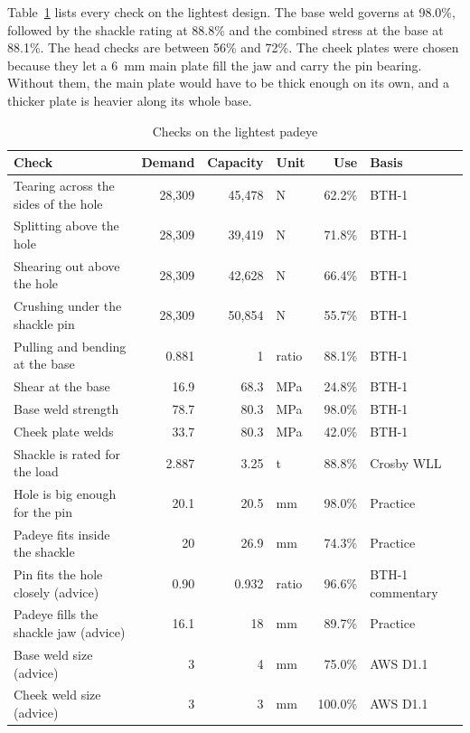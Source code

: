 Table~\ref{tab:padeye-checks} lists every check on the lightest design. The
base weld governs at 98.0\%, followed by the shackle rating at 88.8\% and the
combined stress at the base at 88.1\%. The head checks are between 56\% and
72\%. The cheek plates were chosen because they let a 6~mm main plate fill the
jaw and carry the pin bearing. Without them, the main plate would have to be
thick enough on its own, and a thicker plate is heavier along its whole base.

\begin{table}[H]
\centering
\caption{Checks on the lightest padeye}
\label{tab:padeye-checks}
\small
\begin{tabularx}{\textwidth}{>{\raggedright\arraybackslash}Xrrlr>{\raggedright\arraybackslash}p{}}
\toprule
\textbf{Check} & \textbf{Demand} & \textbf{Capacity} & \textbf{Unit} & \textbf{Use} & \textbf{Basis}\\
\midrule
Tearing across the sides of the hole & 28,309 & 45,478 & N & 62.2\% & BTH-1\\
Splitting above the hole & 28,309 & 39,419 & N & 71.8\% & BTH-1\\
Shearing out above the hole & 28,309 & 42,628 & N & 66.4\% & BTH-1\\
Crushing under the shackle pin & 28,309 & 50,854 & N & 55.7\% & BTH-1\\
Pulling and bending at the base & 0.881 & 1 & ratio & 88.1\% & BTH-1\\
Shear at the base & 16.9 & 68.3 & MPa & 24.8\% & BTH-1\\
Base weld strength & 78.7 & 80.3 & MPa & 98.0\% & BTH-1\\
Cheek plate welds & 33.7 & 80.3 & MPa & 42.0\% & BTH-1\\
Shackle is rated for the load & 2.887 & 3.25 & t & 88.8\% & Crosby WLL\\
Hole is big enough for the pin & 20.1 & 20.5 & mm & 98.0\% & Practice\\
Padeye fits inside the shackle & 20 & 26.9 & mm & 74.3\% & Practice\\
Pin fits the hole closely (advice) & 0.90 & 0.932 & ratio & 96.6\% & BTH-1 commentary\\
Padeye fills the shackle jaw (advice) & 16.1 & 18 & mm & 89.7\% & Practice\\
Base weld size (advice) & 3 & 4 & mm & 75.0\% & AWS D1.1\\
Cheek weld size (advice) & 3 & 3 & mm & 100.0\% & AWS D1.1\\
\bottomrule
\end{tabularx}
\end{table}

